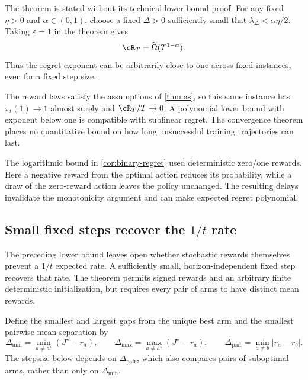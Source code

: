 \documentclass[11pt,twoside]{article}
\theoremstyle{definition}
\theoremstyle{remark}
\begin{document}
The theorem is stated without its technical lower-bound proof. For any fixed
$\eta>0$ and $\alpha\in(0,1)$, choose a fixed $\Delta>0$ sufficiently small
that $\lambda_\Delta<\alpha\eta/2$. Taking $\varepsilon=1$ in the theorem gives
\[
 \cR_T=\widetilde\Omega(T^{1-\alpha}).
\]
Thus the regret exponent can be arbitrarily close to one across fixed
instances, even for a fixed step size.

The reward laws satisfy the assumptions of \cref{thm:as}, so this same
instance has $\pi_t(1)\to1$ almost surely and $\cR_T/T\to0$.
A polynomial lower bound with exponent below one is compatible with
sublinear regret. The convergence theorem places no quantitative bound on
how long unsuccessful training trajectories can last.

The logarithmic bound in \cref{cor:binary-regret} used deterministic
zero/one rewards. Here a negative reward from the optimal action reduces
its probability, while a draw of the zero-reward action leaves the policy
unchanged. The resulting delays invalidate the monotonicity argument and
can make expected regret polynomial.

\subsection{Small fixed steps recover the \texorpdfstring{$1/t$}{1/t} rate}
\label{sec:fixed-step-rate}

The preceding lower bound leaves open whether stochastic rewards themselves
prevent a $1/t$ expected rate. A sufficiently small, horizon-independent
fixed step recovers that rate. The theorem permits signed rewards and an
arbitrary finite deterministic initialization, but requires every pair of
arms to have distinct mean rewards.

Define the smallest and largest gaps from the unique best arm and the
smallest pairwise mean separation by
\[
 \Delta_{\min}=\min_{a\ne a^\star}(J^\star-r_a),\qquad
 \Delta_{\max}=\max_{a\ne a^\star}(J^\star-r_a),\qquad
 \Delta_{\mathrm{pair}}=\min_{a\ne b}|r_a-r_b|.
\]
The stepsize below depends on $\Delta_{\mathrm{pair}}$, which also compares
pairs of suboptimal arms, rather than only on $\Delta_{\min}$.
\end{document}
